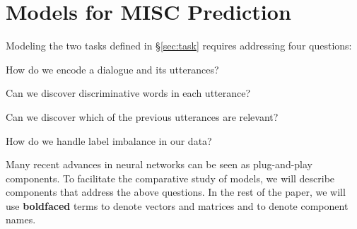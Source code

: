 \section{Models for MISC Prediction}
\label{sec:snt:devices}



Modeling the two tasks defined in \S\ref{sec:task} requires
addressing four questions:
\begin{inparaenum}[(1)]
\item How do we encode a dialogue and its utterances?
\item Can we discover discriminative words in each utterance?
\item Can we discover which of the previous utterances are relevant?
\item How do we handle label imbalance in our data?
\end{inparaenum}
%
Many recent advances in %
neural networks can
be seen as plug-and-play components. To facilitate the comparative
study of models, we will describe components that address the
above questions.  %
%
In the rest of the paper, we will use \textbf{boldfaced} terms to
denote vectors and matrices and  to denote
component names.



%

